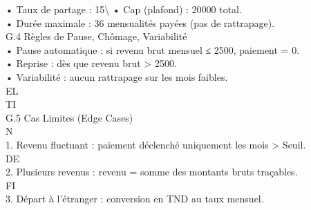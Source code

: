 \documentclass[12pt,landscape,a4paper]{article}
\begin{document}
\vspace{0.5em}
\vspace{0.5em}
• Taux de partage : 15\textbackslash{}%
\vspace{0.5em}
• Cap (plafond) : 20000 total.\\
\vspace{0.5em}
• Durée maximale : 36 mensualités payées (pas de rattrapage).\\
\vspace{0.5em}
\vspace{0.5em}
\vspace{0.5em}
G.4 Règles de Pause, Chômage, Variabilité\\
• Pause automatique : si revenu brut mensuel ≤ 2500, paiement = 0.\\
\vspace{0.5em}
• Reprise : dès que revenu brut \textgreater{} 2500.\\
\vspace{0.5em}
• Variabilité : aucun rattrapage sur les mois faibles.\\
\vspace{0.5em}
\vspace{0.5em}
\vspace{0.5em}
\vspace{0.5em}
EL\\
TI\\
G.5 Cas Limites (Edge Cases)\\
\vspace{0.5em}
\vspace{0.5em}
\vspace{0.5em}
\vspace{0.5em}
N\\
1. Revenu fluctuant : paiement déclenché uniquement les mois \textgreater{} Seuil.\\
\vspace{0.5em}
\vspace{0.5em}
\vspace{0.5em}
\vspace{0.5em}
DE\\
2. Plusieurs revenus : revenu = somme des montants bruts traçables.\\
\vspace{0.5em}
\vspace{0.5em}
\vspace{0.5em}
\vspace{0.5em}
FI\\
3. Départ à l’étranger : conversion en TND au taux mensuel.\\
\end{document}
